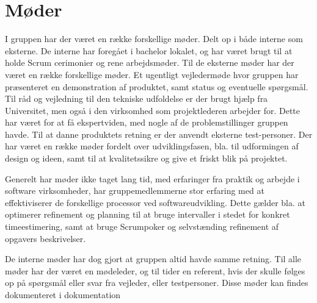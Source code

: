\section{Møder}

I gruppen har der været en række forskellige møder. Delt op i både interne som eksterne. De interne har foregået i bachelor lokalet, og har været brugt til at holde Scrum cerimonier og rene arbejdsmøder. Til de eksterne møder har der været en række forskellige møder. Et ugentligt vejledermøde hvor gruppen har præsenteret en demonstration af produktet, samt status og eventuelle spørgsmål. Til råd og vejledning til den tekniske udfoldelse er der brugt hjælp fra Universitet, men også i den virksomhed som projektlederen arbejder for. Dette har været for at få ekspertviden, med nogle af de problemstillinger gruppen havde. Til at danne produktets retning er der anvendt eksterne test-personer. Der har været en række møder fordelt over udviklingsfasen, bla. til udformingen af design og ideen, samt til at kvalitetssikre og give et friskt blik på projektet.

Generelt har møder ikke taget lang tid, med erfaringer fra praktik og arbejde i software virksomheder, har gruppemedlemmerne stor erfaring med at effektiviserer de forskellige processor ved softwareudvikling. Dette gælder bla. at optimerer refinement og planning til at bruge intervaller i stedet for konkret timeestimering, samt at bruge Scrumpoker og selvstænding refinement af opgavers beskrivelser.

De interne møder har dog gjort at gruppen altid havde samme retning. Til alle møder har der været en mødeleder, og til tider en referent, hvis der skulle følges op på spørgsmål eller svar fra vejleder, eller testpersoner. Disse møder kan findes dokumenteret i dokumentation \cite{meetings}